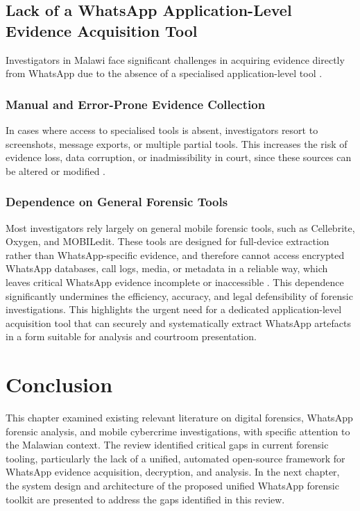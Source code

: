 \documentclass[12pt,a4paper]{report}
\begin{document}
\subsection{Lack of a WhatsApp Application-Level Evidence Acquisition Tool}

Investigators in Malawi face significant challenges in acquiring evidence directly from WhatsApp due to the absence of a specialised application-level tool \citep{chimoyo2024, mtegha2024}.

\subsubsection{Manual and Error-Prone Evidence Collection}

In cases where access to specialised tools is absent, investigators resort to screenshots, message exports, or multiple partial tools. This increases the risk of evidence loss, data corruption, or inadmissibility in court, since these sources can be altered or modified \citep{nishchal2024}.

\subsubsection{Dependence on General Forensic Tools}

Most investigators rely largely on general mobile forensic tools, such as Cellebrite, Oxygen, and MOBILedit. These tools are designed for full-device extraction rather than WhatsApp-specific evidence, and therefore cannot access encrypted WhatsApp databases, call logs, media, or metadata in a reliable way, which leaves critical WhatsApp evidence incomplete or inaccessible \citep{alissa2019}. This dependence significantly undermines the efficiency, accuracy, and legal defensibility of forensic investigations. This highlights the urgent need for a dedicated application-level acquisition tool that can securely and systematically extract WhatsApp artefacts in a form suitable for analysis and courtroom presentation.

\section{Conclusion}

This chapter examined existing relevant literature on digital forensics, WhatsApp forensic analysis, and mobile cybercrime investigations, with specific attention to the Malawian context. The review identified critical gaps in current forensic tooling, particularly the lack of a unified, automated open-source framework for WhatsApp evidence acquisition, decryption, and analysis. In the next chapter, the system design and architecture of the proposed unified WhatsApp forensic toolkit are presented to address the gaps identified in this review.
\end{document}
